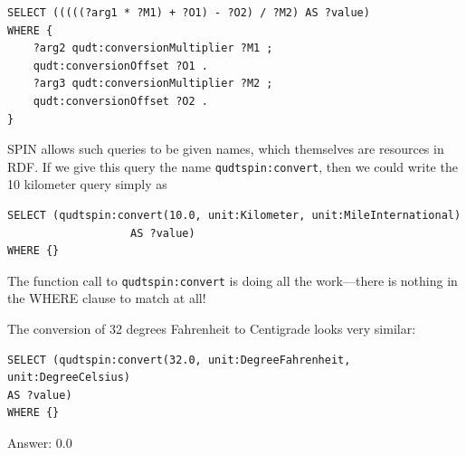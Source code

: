 \begin{lstlisting}
SELECT (((((?arg1 * ?M1) + ?O1) - ?O2) / ?M2) AS ?value)
WHERE {
    ?arg2 qudt:conversionMultiplier ?M1 ;
    qudt:conversionOffset ?O1 .
    ?arg3 qudt:conversionMultiplier ?M2 ;
    qudt:conversionOffset ?O2 .
}
\end{lstlisting}

SPIN allows such queries to be given names, which themselves are
resources in RDF. If we give this query the name \texttt{qudtspin:convert}, then
we could write the 10 kilometer query simply as

\begin{lstlisting}
SELECT (qudtspin:convert(10.0, unit:Kilometer, unit:MileInternational)
                   AS ?value)
WHERE {}
\end{lstlisting}

The function call to \texttt{qudtspin:convert} is doing all the work---there is
nothing in the
WHERE clause to match at all!

The conversion of 32 degrees Fahrenheit to Centigrade looks very
similar:

\begin{lstlisting}
SELECT (qudtspin:convert(32.0, unit:DegreeFahrenheit,
unit:DegreeCelsius)
AS ?value)
WHERE {}
\end{lstlisting}

Answer: 0.0

